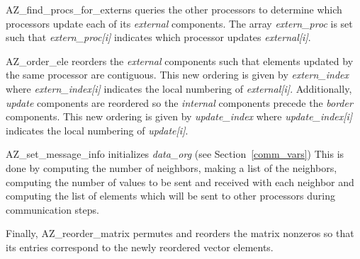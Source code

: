{\sf AZ\_find\_procs\_for\_externs} queries the other processors to determine
which processors update each of its {\it external} components. The array {\it
  extern\_proc\/} is set such that {\it extern\_proc[i]\/} indicates which
processor updates {\it external[i]\/}.

{\sf AZ\_order\_ele} reorders the {\it external} components such that elements
updated by the same processor are contiguous. This new ordering is given by
{\it extern\_index\/} where {\it extern\_index[i]\/} indicates the local
numbering of {\it external[i]\/}.  Additionally, {\it update} components are
reordered so the {\it internal} components precede the {\it border} components.
This new ordering is given by {\it update\_index\/} where {\it
  update\_index[i]\/} indicates the local numbering of {\it update[i]\/}.

{\sf AZ\_set\_message\_info} initializes {\it data\_org\/} (see
Section~\ref{comm_vars}) This is done by computing the number of neighbors,
making a list of the neighbors, computing the number of values to be sent and
received with each neighbor and computing the list of elements which will be
sent to other processors during communication steps.

Finally, {\sf AZ\_reorder\_matrix} permutes and reorders the matrix nonzeros so
that its entries correspond to the newly reordered vector elements.

